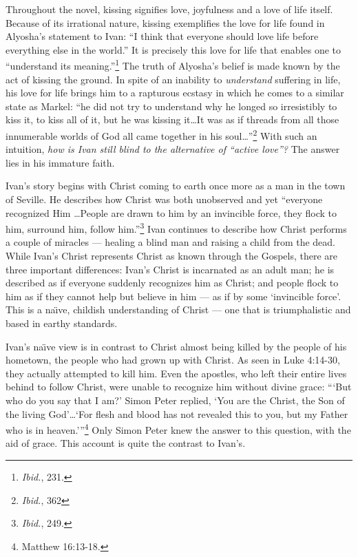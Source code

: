 Throughout the novel, kissing signifies love, joyfulness and a love of life itself. Because of its irrational nature, kissing exemplifies the love for life found in Alyosha's statement to Ivan: ``I think that everyone should love life before everything else in the world.'' It is precisely this love for life that enables one to ``understand its meaning.''\footnote{\emph{Ibid.}, 231.} The truth of Alyosha's belief is made known by the act of kissing the ground. In spite of an inability to \emph{understand} suffering in life, his love for life brings him to a rapturous ecstasy in which he comes to a similar state as Markel: ``he did not try to understand why he longed so irresistibly to kiss it, to kiss all of it, but he was kissing it\ldots It was as if threads from all those innumerable worlds of God all came together in his soul\ldots''\footnote{\emph{Ibid.}, 362} With such an intuition, \emph{how is Ivan still blind to the alternative of ``active love''?} The answer lies in his immature faith.

Ivan's story begins with Christ coming to earth once more as a man in the town of Seville. He describes how Christ was both unobserved and yet ``everyone recognized Him \ldots People are drawn to him by an invincible force, they flock to him, surround him, follow him.''\footnote{\emph{Ibid.}, 249.} Ivan continues to describe how Christ performs a couple of miracles --- healing a blind man and raising a child from the dead. While Ivan's Christ represents Christ as known through the Gospels, there are three important differences: Ivan's Christ is incarnated as an adult man; he is described as if everyone suddenly recognizes him as Christ; and people flock to him as if they cannot help but believe in him --- as if by some `invincible force'. This is a na\"{\i}ve, childish understanding of Christ --- one that is triumphalistic and based in earthy standards. 

Ivan's na\"{\i}ve view is in contrast to Christ almost being killed by the people of his hometown, the people who had grown up with Christ. As seen in Luke 4:14-30, they actually attempted to kill him. Even the apostles, who left their entire lives behind to follow Christ, were unable to recognize him without divine grace: ``\thinspace`But who do you say that I am?' Simon Peter replied, `You are the Christ, the Son of the living God'\ldots `For flesh and blood has not revealed this to you, but my Father who is in heaven.'\thinspace''\footnote{Matthew 16:13-18.} Only Simon Peter knew the answer to this question, with the aid of grace. This account is quite the contrast to Ivan's.

